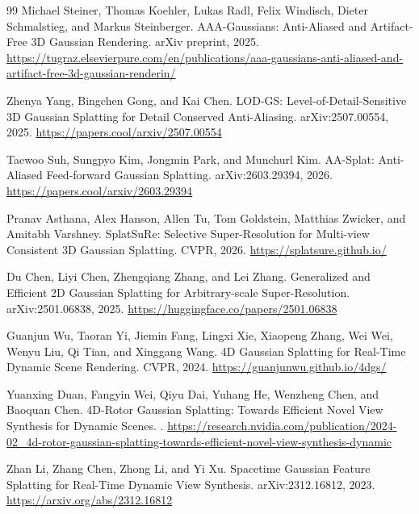 \documentclass[11pt]{article}
\begin{document}
\begin{thebibliography}{99}
Michael Steiner, Thomas Koehler, Lukas Radl, Felix Windisch,
Dieter Schmalstieg, and Markus Steinberger.
\newblock AAA-Gaussians: Anti-Aliased and Artifact-Free 3D Gaussian Rendering.
\newblock arXiv preprint, 2025.
\newblock \url{https://tugraz.elsevierpure.com/en/publications/aaa-gaussians-anti-aliased-and-artifact-free-3d-gaussian-renderin/}

Zhenya Yang, Bingchen Gong, and Kai Chen.
\newblock LOD-GS: Level-of-Detail-Sensitive 3D Gaussian Splatting for Detail
Conserved Anti-Aliasing.
\newblock arXiv:2507.00554, 2025.
\newblock \url{https://papers.cool/arxiv/2507.00554}

Taewoo Suh, Sungpyo Kim, Jongmin Park, and Munchurl Kim.
\newblock AA-Splat: Anti-Aliased Feed-forward Gaussian Splatting.
\newblock arXiv:2603.29394, 2026.
\newblock \url{https://papers.cool/arxiv/2603.29394}

Pranav Asthana, Alex Hanson, Allen Tu, Tom Goldstein, Matthias Zwicker,
and Amitabh Varshney.
\newblock SplatSuRe: Selective Super-Resolution for Multi-view Consistent 3D
Gaussian Splatting.
\newblock CVPR, 2026.
\newblock \url{https://splatsure.github.io/}

Du Chen, Liyi Chen, Zhengqiang Zhang, and Lei Zhang.
\newblock Generalized and Efficient 2D Gaussian Splatting for Arbitrary-scale
Super-Resolution.
\newblock arXiv:2501.06838, 2025.
\newblock \url{https://huggingface.co/papers/2501.06838}

Guanjun Wu, Taoran Yi, Jiemin Fang, Lingxi Xie, Xiaopeng Zhang, Wei Wei,
Wenyu Liu, Qi Tian, and Xinggang Wang.
\newblock 4D Gaussian Splatting for Real-Time Dynamic Scene Rendering.
\newblock CVPR, 2024.
\newblock \url{https://guanjunwu.github.io/4dgs/}

Yuanxing Duan, Fangyin Wei, Qiyu Dai, Yuhang He, Wenzheng Chen, and Baoquan Chen.
\newblock 4D-Rotor Gaussian Splatting: Towards Efficient Novel View Synthesis
for Dynamic Scenes.
.
\newblock \url{https://research.nvidia.com/publication/2024-02_4d-rotor-gaussian-splatting-towards-efficient-novel-view-synthesis-dynamic}

Zhan Li, Zhang Chen, Zhong Li, and Yi Xu.
\newblock Spacetime Gaussian Feature Splatting for Real-Time Dynamic View
Synthesis.
\newblock arXiv:2312.16812, 2023.
\newblock \url{https://arxiv.org/abs/2312.16812}


\end{thebibliography}
\end{document}
